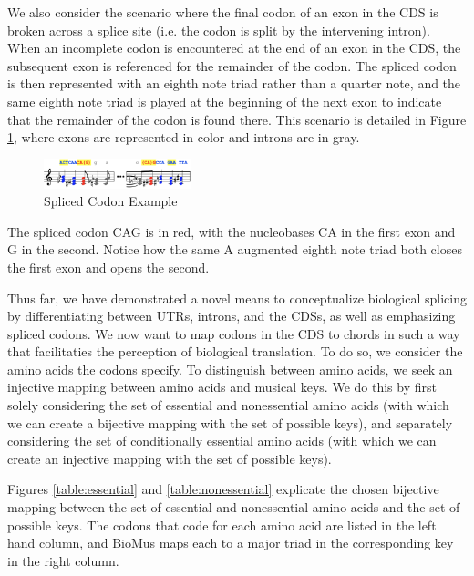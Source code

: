 \documentclass[letterpaper]{article}
\begin{document}
We also consider the scenario where the final codon of an exon in the CDS is broken across a splice site (i.e. the codon is split by the intervening intron). When an incomplete codon is encountered at the end of an exon in the CDS, the subsequent exon is referenced for the remainder of the codon. The spliced codon is then represented with an eighth note triad rather than a quarter note, and the same eighth note triad is played at the beginning of the next exon to indicate that the remainder of the codon is found there. This scenario is detailed in Figure \ref{fig:splice_site_example}, where exons are represented in color and introns are in gray. 

\begin{figure}[h!]
\centering
\includegraphics[width=0.38\textwidth]{images/splice_site_example}
  \caption{Spliced Codon Example}
  \label{fig:splice_site_example}
  \vspace{-3mm}
\end{figure}

The spliced codon CAG is in red, with the nucleobases CA in the first exon and G in the second. Notice how the same A augmented eighth note triad both closes the first exon and opens the second.

Thus far, we have demonstrated a novel means to conceptualize biological splicing by differentiating between UTRs, introns, and the CDSs, as well as emphasizing spliced codons. We now want to map codons in the CDS to chords in such a way that facilitaties the perception of biological translation. To do so,
we consider the amino acids the codons specify. To distinguish between amino acids, we seek an injective mapping between amino acids and musical keys. We do this by first solely considering the set of essential and nonessential amino acids (with which we can create a bijective mapping with the set of possible keys), and separately considering the set of conditionally essential amino acids (with which we can create an injective mapping with the set of possible keys).

Figures \ref{table:essential} and \ref{table:nonessential} explicate the chosen bijective mapping between the set of essential and nonessential amino acids and the set of possible keys. The codons that code for each amino acid are listed in the left hand column, and BioMus maps each to a major triad in the corresponding key in the right column. 
\end{document}
